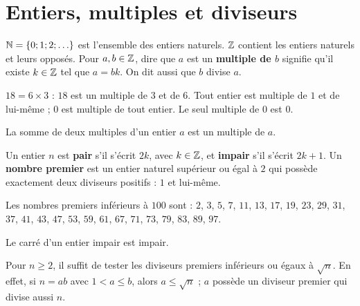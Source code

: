 \section{Entiers, multiples et diviseurs}
\begin{cours}[Définitions]
$\mathbb{N}=\{0;1;2;\ldots\}$ est l'ensemble des entiers naturels. $\mathbb{Z}$ contient les entiers naturels et leurs opposés.
Pour $a,b\in\mathbb{Z}$, dire que $a$ est un \textbf{multiple de $b$} signifie qu'il existe $k\in\mathbb{Z}$ tel que $a=bk$. On dit aussi que $b$ divise $a$.
\end{cours}
$18=6\times3$ : $18$ est un multiple de $3$ et de $6$. Tout entier est multiple de $1$ et de lui-même ; $0$ est multiple de tout entier. Le seul multiple de $0$ est $0$.
\begin{cours}
La somme de deux multiples d'un entier $a$ est un multiple de $a$.
\end{cours}

\begin{cours}[Définitions]
Un entier $n$ est \textbf{pair} s'il s'écrit $2k$, avec $k\in\mathbb{Z}$, et \textbf{impair} s'il s'écrit $2k+1$.
Un \textbf{nombre premier} est un entier naturel supérieur ou égal à $2$ qui possède exactement deux diviseurs positifs : $1$ et lui-même.
\end{cours}
Les nombres premiers inférieurs à $100$ sont : $2$, $3$, $5$, $7$, $11$, $13$, $17$, $19$, $23$, $29$, $31$, $37$, $41$, $43$, $47$, $53$, $59$, $61$, $67$, $71$, $73$, $79$, $83$, $89$, $97$.
\begin{cours}
Le carré d'un entier impair est impair.
\end{cours}
\begin{methode}
Pour $n\geq2$, il suffit de tester les diviseurs premiers inférieurs ou égaux à $\sqrt n$. En effet, si $n=ab$ avec $1<a\leq b$, alors $a\leq\sqrt n$ ; $a$ possède un diviseur premier qui divise aussi $n$.
\end{methode}

